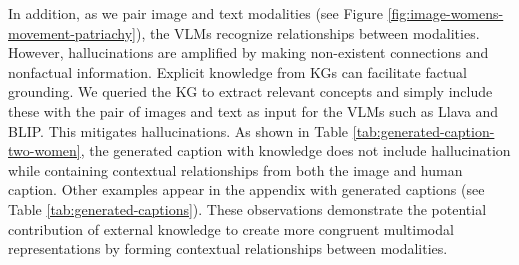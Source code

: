 In addition, as we pair image and text modalities (see Figure \ref{fig:image-womens-movement-patriachy}),
the VLMs recognize relationships between modalities. %
However, hallucinations are amplified by making non-existent connections and nonfactual information. Explicit knowledge from KGs can facilitate 
factual grounding.
We queried the KG to extract relevant concepts and simply include these with the pair of images and text as input for the VLMs such as Llava and BLIP. 
This mitigates hallucinations. 
As shown in Table \ref{tab:generated-caption-two-women}, the generated caption with knowledge does not include hallucination while containing contextual relationships from both the image and human caption.
Other examples appear in the appendix with generated captions (see Table \ref{tab:generated-captions}). 
These observations demonstrate the potential contribution of external knowledge to create more congruent multimodal representations by forming contextual relationships between modalities.  



